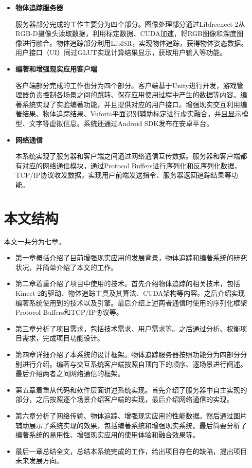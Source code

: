\begin{itemize}
    \item \textbf{物体追踪服务器}
    
    服务器部分完成的工作主要分为四个部分。图像处理部分通过Libfreenect 2从RGB-D摄像头读取数据，利用标定数据、CUDA加速，将RGB图像和深度图像进行融合。物体追踪部分利用LibISR\cite{Ren_3DV_2014, star3d_iccv_2013}，实现物体追踪，获得物体姿态数据。用户接口（UI）同过GLUT实现计算结果显示，获取用户输入等功能。
    
    \item \textbf{编著和增强现实应用客户端}
    
    客户端部分完成的工作也分为四个部分。客户端基于Unity进行开发，游戏管理器负责控制各场景之间的跳转、保存应用使用过程中产生的数据等内容。编著系统实现了实验编著功能，并且提供对应的用户接口。增强现实交互利用编著结果、物体追踪结果、Vuforia平面识别辅助标定进行虚实融合，并且显示模型、文字等虚拟信息。系统还通过Android SDK发布在安卓平台。
    
    \item \textbf{网络通信}
    
    本系统实现了服务器和客户端之间通过网络通信互传数据。服务器和客户端都有对应的网络通信模块，通过Protocol Buffers进行序列化和反序列化数据，TCP/IP协议收发数据，实现用户前端发送指令、服务器返回追踪结果等功能。
    
\end{itemize}


\section{本文结构}
本文一共分为七章。
\begin{itemize}[noitemsep,topsep=0pt,parsep=0pt,partopsep=0pt]
\item 第一章概括介绍了目前增强现实应用的发展背景，物体追踪和编著系统的研究状况，并简单介绍了本文的工作。
\item 第二章着重介绍了项目中使用的技术。首先介绍物体追踪的相关技术，包括Kinect 2的驱动、物体追踪工具及其算法、CUDA架构等内容。之后介绍实现编著系统使用到的技术以及引擎。最后介绍上述两者通信时使用的序列化框架Protocol Buffers和TCP/IP协议等。
\item 第三章分析了项目需求，包括技术需求、用户需求等。之后通过分析、权衡项目需求，完成项目功能设计。
\item 第四章详细介绍了本系统的设计框架。物体追踪服务器按照功能分为四部分分别进行介绍。编著与交互系统客户端按照自顶向下的顺序、逐场景进行阐述。最后介绍两者之间网络通信的框架。
\item 第五章着重从代码和软件层面讲述系统实现。首先介绍了服务器中自主实现的部分，之后按照逐个场景介绍客户端的实现，最后介绍网络通信的实现。
\item 第六章分析了网络传输、物体追踪、增强现实应用的性能数据。然后通过图片辅助展示了系统实现的效果，包括编著系统和增强现实系统。最后简要分析了编著系统的易用性、增强现实应用的使用体验和融合效果等。
\item 最后一章总结全文，总结本系统完成的工作，给出项目存在的缺陷，提出项目未来发展方向。
\end{itemize}
